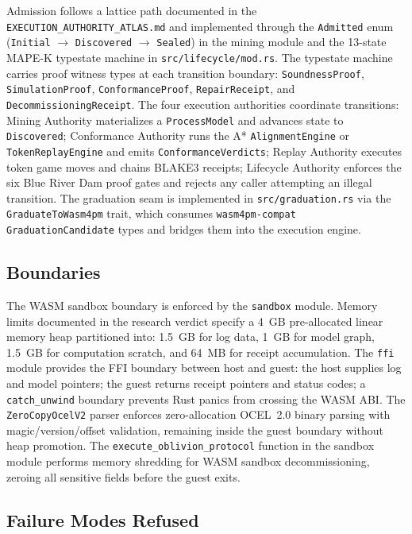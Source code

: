 Admission follows a lattice path documented in the \texttt{EXECUTION\_AUTHORITY\_ATLAS.md} and
implemented through the \texttt{Admitted} enum (\texttt{Initial} $\to$ \texttt{Discovered} $\to$
\texttt{Sealed}) in the mining module and the 13-state MAPE-K typestate machine in
\texttt{src/lifecycle/mod.rs}. The typestate machine carries proof witness types at each
transition boundary: \texttt{SoundnessProof}, \texttt{SimulationProof}, \texttt{ConformanceProof},
\texttt{RepairReceipt}, and \texttt{DecommissioningReceipt}. The four execution authorities
coordinate transitions: Mining Authority materializes a \texttt{ProcessModel} and advances state
to \texttt{Discovered}; Conformance Authority runs the A* \texttt{AlignmentEngine} or
\texttt{TokenReplayEngine} and emits \texttt{ConformanceVerdicts}; Replay Authority executes
token game moves and chains BLAKE3 receipts; Lifecycle Authority enforces the six Blue River Dam
proof gates and rejects any caller attempting an illegal transition. The graduation seam is
implemented in \texttt{src/graduation.rs} via the \texttt{GraduateToWasm4pm} trait, which
consumes \texttt{wasm4pm-compat} \texttt{GraduationCandidate} types and bridges them into the
execution engine.

\subsection{Boundaries}
\label{sec:sources-wasm4pm-arch-boundaries}

The WASM sandbox boundary is enforced by the \texttt{sandbox} module. Memory limits documented in
the research verdict specify a 4~GB pre-allocated linear memory heap partitioned into: 1.5~GB for
log data, 1~GB for model graph, 1.5~GB for computation scratch, and 64~MB for receipt
accumulation. The \texttt{ffi} module provides the FFI boundary between host and guest: the host
supplies log and model pointers; the guest returns receipt pointers and status codes; a
\texttt{catch\_unwind} boundary prevents Rust panics from crossing the WASM ABI. The
\texttt{ZeroCopyOcelV2} parser enforces zero-allocation OCEL~2.0 binary parsing with
magic/version/offset validation, remaining inside the guest boundary without heap promotion.
The \texttt{execute\_oblivion\_protocol} function in the sandbox module performs memory shredding
for WASM sandbox decommissioning, zeroing all sensitive fields before the guest exits.

\subsection{Failure Modes Refused}
\label{sec:sources-wasm4pm-arch-failure-modes}

